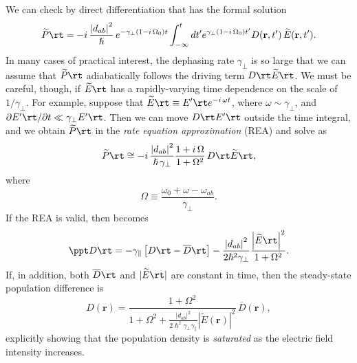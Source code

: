 We can check by direct differentiation that  has the formal solution
 \begin{equation} \label{eqn:fls_mbe_rwa_pol_formal}
\widetilde{P}\rt = - i\, \frac{\left|d_{a b}\right|^2}{\hslash}\, e^{-\gamma_\perp (1 - i\, \Omega_0) t} \int_{-\infty}^{t} d t^\prime e^{\gamma_\perp (1 - i\, \Omega_0) t^\prime} D(\mathbf{r}, t^\prime)\, \widetilde{E}(\mathbf{r}, t^\prime) .\end{equation}
In many cases of practical interest, the dephasing rate $\gamma_\perp$ is so large that we can assume that $\widetilde{P}\rt$ adiabatically follows the driving term $D\rt \widetilde{E}\rt$. We must be careful, though, if $\widetilde{E}\rt$ has a rapidly-varying time dependence on the scale of $1/\gamma_\perp$. For example, suppose that $\widetilde{E}\rt \equiv E^\prime\rt e^{-i\, \omega t}$, where $\omega \sim \gamma_\perp$, and $\partial E^\prime\rt / \partial t \ll \gamma_\perp E^\prime \rt$. Then we can move $D\rt E^\prime\rt$ outside the time integral, and we obtain $\widetilde{P}\rt$ in the \emph{rate equation approximation} (REA) and solve  as
 \begin{equation}\label{eqn:fls_mbe_rwa_rea}
\widetilde{P}\rt \cong - i\, \frac{\left|d_{a b}\right|^2}{\hslash\, \gamma_\perp} \frac{1 + i\, \Omega}{1 + \Omega^2}\, D\rt \widetilde{E}\rt ,
 \end{equation}
where
 \begin{equation} \label{eqn:fls_omega_def}
\Omega \equiv \frac{\omega_0 + \omega - \omega_{a b}}{\gamma_\perp} .
 \end{equation}
If the REA is valid, then  becomes
 \begin{equation}\label{eqn:fls_mbe_rwa_pop_diff_rea}
\ppt D\rt = -\gamma_\parallel \left[ D\rt - \overline{D}\rt \right] - \frac{\left|d_{a b}\right|^2}{2 \hslash^2 \gamma_\perp} \frac{\left|\widetilde{E}\rt\right|^2}{1 + \Omega^2}.
 \end{equation}
If, in addition, both $\overline{D}\rt$ and $|\widetilde{E}\rt|$ are constant in time, then the steady-state population difference is
 \begin{equation}\label{eqn:fls_mbe_rwa_pop_diff_cw}
D(\mathbf{r}) = \frac{1 + \Omega^2}{1 + \Omega^2 + \frac{\left|d_{a b}\right|^2}{2 \hslash^2 \gamma_\perp \gamma_\parallel} \left|\widetilde{E}(\mathbf{r})\right|^2}\, \overline{D}(\mathbf{r}) ,
 \end{equation}
explicitly showing that the population density is \emph{saturated} as the electric field intensity increases.


